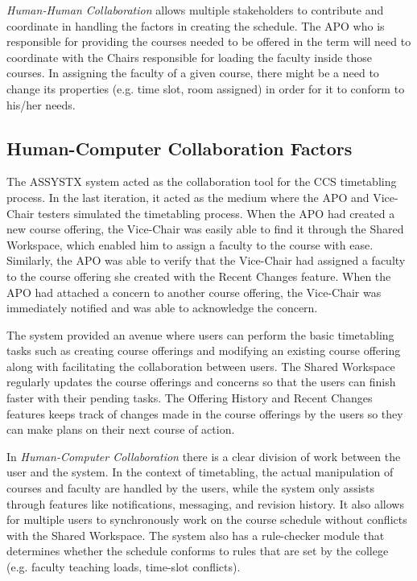 

\textit{Human-Human Collaboration} allows multiple stakeholders to contribute and coordinate in handling the factors in creating the schedule. The APO who is responsible for providing the courses needed to be offered in the term will need to coordinate with the Chairs responsible for loading the faculty inside those courses. In assigning the faculty of a given course, there might be a need to change its properties (e.g. time slot, room assigned) in order for it to conform to his/her needs.


\subsection{Human-Computer Collaboration Factors}
The ASSYSTX system acted as the collaboration tool for the CCS timetabling process. In the last iteration, it acted as the medium where the APO and Vice-Chair testers simulated the timetabling process. When the APO had created a new course offering, the Vice-Chair was easily able to find it through the Shared Workspace, which enabled him to assign a faculty to the course with ease. Similarly, the APO was able to verify that the Vice-Chair had assigned a faculty to the course offering she created with the Recent Changes feature. When the APO had attached a concern to another course offering, the Vice-Chair was immediately notified and was able to acknowledge the concern. 

The system provided an avenue where users can perform the basic timetabling tasks such as creating course offerings and modifying an existing course offering along with facilitating the collaboration between users. The Shared Workspace regularly updates the course offerings and concerns so that the users can finish faster with their pending tasks. The Offering History and Recent Changes features keeps track of changes made in the course offerings by the users so they can make plans on their next course of action.

In \textit{Human-Computer Collaboration} there is a clear division of work between the user and the system. In the context of timetabling, the actual manipulation of courses and faculty are handled by the users, while the system only assists through features like notifications, messaging, and revision history. It also allows for multiple users to synchronously work on the course schedule without conflicts with the Shared Workspace. The system also has a rule-checker module that determines whether the schedule conforms to rules that are set by the college (e.g. faculty teaching loads, time-slot conflicts).  


